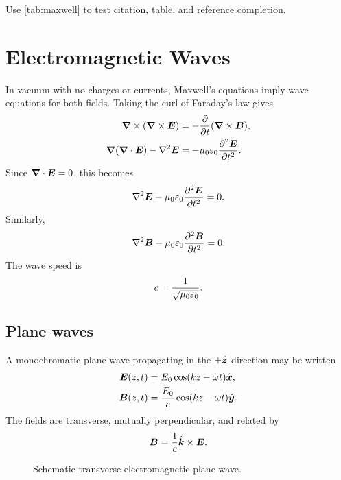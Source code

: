 Use \cref{tab:maxwell} to test citation, table, and reference completion.

\newpage

\section{Electromagnetic Waves}
\label{sec:waves}

In vacuum with no charges or currents, Maxwell's equations imply wave equations for both fields.
Taking the curl of Faraday's law gives
\begin{align}
  \bm{\nabla} \times(\bm{\nabla} \times\bm{E})
  &=
  -
  \frac{\partial}{\partial t}
  (\bm{\nabla} \times\bm{B}), \\
  \bm{\nabla}(\bm{\nabla} \cdot\bm{E})-\nabla^2\bm{E}
  &=
  -
  \mu_0\varepsilon_0
  \frac{\partial^2\bm{E}}{\partial t^2}.
\end{align}
Since \(\bm{\nabla} \cdot\bm{E}=0\), this becomes
\begin{equation}
  \nabla^2\bm{E}
  -
  \mu_0\varepsilon_0
  \frac{\partial^2\bm{E}}{\partial t^2}
  =
  0.
  \label{eq:e-wave}
\end{equation}
Similarly,
\begin{equation}
  \nabla^2\bm{B}
  -
  \mu_0\varepsilon_0
  \frac{\partial^2\bm{B}}{\partial t^2}
  =
  0.
  \label{eq:b-wave}
\end{equation}
The wave speed is
\begin{equation}
  c = \frac{1}{\sqrt{\mu_0\varepsilon_0}}.
  \label{eq:speed-of-light}
\end{equation}

\subsection{Plane waves}

A monochromatic plane wave propagating in the \(+\hat{\bm{z}}\) direction may be written
\begin{align}
  \bm{E}(z,t)
  &=
  E_0 \cos(kz-\omega t)\hat{\bm{x}},
  \\
  \bm{B}(z,t)
  &=
  \frac{E_0}{c}\cos(kz-\omega t)\hat{\bm{y}}.
\end{align}
The fields are transverse, mutually perpendicular, and related by
\begin{equation}
  \bm{B} = \frac{1}{c}\hat{\bm{k}}\times\bm{E}.
\end{equation}

\begin{figure}[h]
\centering
{}
\caption{Schematic transverse electromagnetic plane wave.}
\label{fig:plane-wave}
\end{figure}

